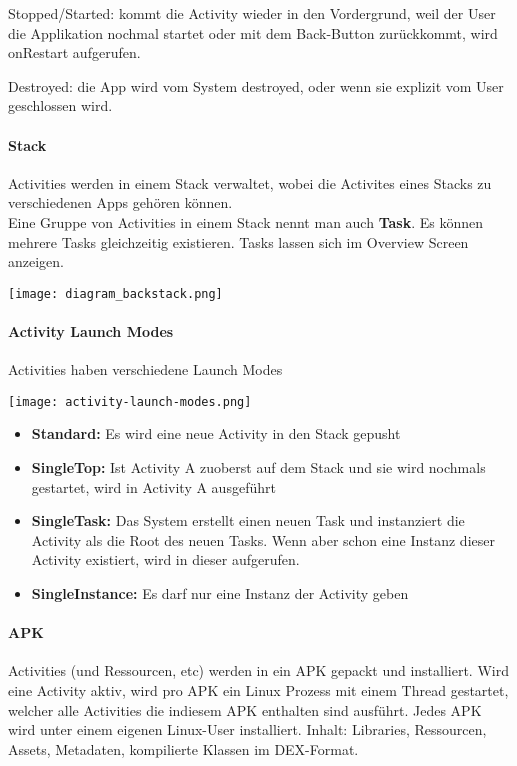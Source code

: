 Stopped/Started: kommt die Activity wieder in den Vordergrund, weil der User die Applikation nochmal startet oder mit dem Back-Button zurückkommt, wird onRestart aufgerufen.

Destroyed: die App wird vom System destroyed, oder wenn sie explizit vom User geschlossen wird.

\paragraph{Stack}

Activities werden in einem Stack verwaltet, wobei die Activites eines Stacks zu verschiedenen Apps gehören können.\\ 
Eine Gruppe von Activities in einem Stack nennt man auch \textbf{Task}. Es können mehrere Tasks gleichzeitig existieren. Tasks lassen sich im Overview Screen anzeigen.

\texttt{[image: diagram\_backstack.png]}

\paragraph{Activity Launch Modes} Activities haben verschiedene Launch Modes

\texttt{[image: activity-launch-modes.png]}

\begin{itemize}
\item \textbf{Standard:} Es wird eine neue Activity in den Stack gepusht
\item \textbf{SingleTop:} Ist Activity A zuoberst auf dem Stack und sie wird nochmals gestartet, wird in Activity A  ausgeführt
\item \textbf{SingleTask:} Das System erstellt einen neuen Task und instanziert die Activity als die Root des neuen Tasks. Wenn aber schon eine Instanz dieser Activity existiert, wird  in dieser aufgerufen. 
\item \textbf{SingleInstance:} Es darf nur eine Instanz der Activity geben
\end{itemize}

\paragraph{APK}

Activities (und Ressourcen, etc) werden in ein APK gepackt und installiert. Wird eine Activity aktiv, wird pro APK ein Linux Prozess mit einem Thread gestartet, welcher alle Activities die indiesem APK enthalten sind ausführt. Jedes APK wird unter einem eigenen Linux-User installiert. Inhalt: Libraries, Ressourcen, Assets, Metadaten, kompilierte Klassen im DEX-Format.

